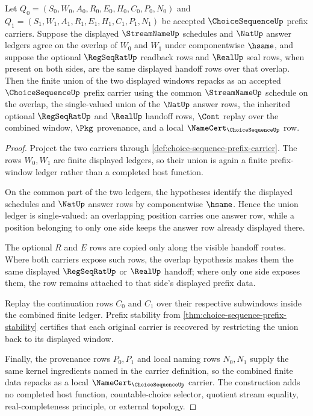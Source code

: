 \begin{theorem}
\label{thm:choice-sequence-prefix-amalgamation}
Let $Q_0=(S_0,W_0,A_0,R_0,E_0,H_0,C_0,P_0,N_0)$ and $Q_1=(S_1,W_1,A_1,R_1,E_1,H_1,C_1,P_1,N_1)$ be accepted $\ChoiceSequenceUp$ prefix carriers. Suppose the displayed $\StreamNameUp$ schedules and $\NatUp$ answer ledgers agree on the overlap of $W_0$ and $W_1$ under componentwise $\hsame$, and suppose the optional $\RegSeqRatUp$ readback rows and $\RealUp$ seal rows, when present on both sides, are the same displayed handoff rows over that overlap. Then the finite union of the two displayed windows repacks as an accepted $\ChoiceSequenceUp$ prefix carrier using the common $\StreamNameUp$ schedule on the overlap, the single-valued union of the $\NatUp$ answer rows, the inherited optional $\RegSeqRatUp$ and $\RealUp$ handoff rows, $\Cont$ replay over the combined window, $\Pkg$ provenance, and a local $\NameCert_{\ChoiceSequenceUp}$ row.
\end{theorem}
\begin{proof}
Project the two carriers through \autoref{def:choice-sequence-prefix-carrier}. The rows $W_0,W_1$ are finite displayed ledgers, so their union is again a finite prefix-window ledger rather than a completed host function.

On the common part of the two ledgers, the hypotheses identify the displayed schedules and $\NatUp$ answer rows by componentwise $\hsame$. Hence the union ledger is single-valued: an overlapping position carries one answer row, while a position belonging to only one side keeps the answer row already displayed there.

The optional $R$ and $E$ rows are copied only along the visible handoff routes. Where both carriers expose such rows, the overlap hypothesis makes them the same displayed $\RegSeqRatUp$ or $\RealUp$ handoff; where only one side exposes them, the row remains attached to that side's displayed prefix data.

Replay the continuation rows $C_0$ and $C_1$ over their respective subwindows inside the combined finite ledger. Prefix stability from \autoref{thm:choice-sequence-prefix-stability} certifies that each original carrier is recovered by restricting the union back to its displayed window.

Finally, the provenance rows $P_0,P_1$ and local naming rows $N_0,N_1$ supply the same kernel ingredients named in the carrier definition, so the combined finite data repacks as a local $\NameCert_{\ChoiceSequenceUp}$ carrier. The construction adds no completed host function, countable-choice selector, quotient stream equality, real-completeness principle, or external topology.
\end{proof}


